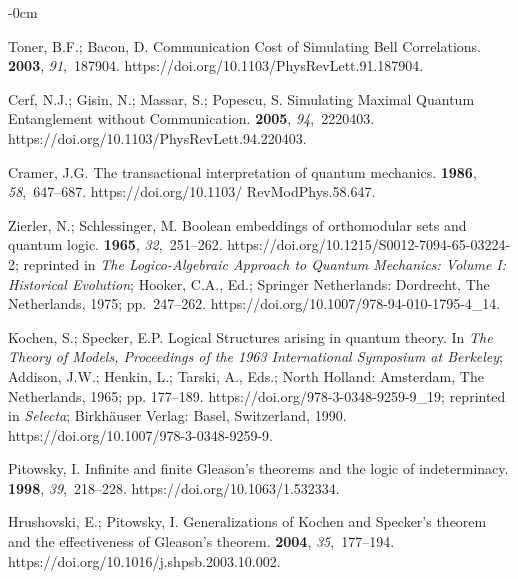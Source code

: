 \documentclass[entropy,article,accept,oneauthor,pdftex]{Definitions/mdpi}
\begin{document}
\begin{adjustwidth}{-\extralength}{0cm}
\begin{thebibliography}{999}
Toner, B.F.; Bacon, D.
\newblock Communication Cost of Simulating {B}ell Correlations.
 {\bf 2003}, {\em 91},~187904.
\newblock
  {https://doi.org/10.1103/PhysRevLett.91.187904}.



Cerf, N.J.; Gisin, N.; Massar, S.; Popescu, S.
\newblock Simulating Maximal Quantum Entanglement without Communication.
 {\bf 2005}, {\em 94},~2220403.
\newblock
  {https://doi.org/10.1103/PhysRevLett.94.220403}.

Cramer, J.G.
\newblock The transactional interpretation of quantum mechanics.
 {\bf 1986}, {\em 58},~647--687.
\newblock
  {https://doi.org/10.1103/ RevModPhys.58.647}.

Zierler, N.; Schlessinger, M.
\newblock Boolean embeddings of orthomodular sets and quantum logic.
 {\bf 1965}, {\em 32},~251--262.
\newblock
  {https://doi.org/10.1215/S0012-7094-65-03224-2};
 reprinted in \emph{The Logico-Algebraic Approach to Quantum Mechanics: Volume {I}:
  Historical Evolution}; Hooker, C.A., Ed.; Springer Netherlands: Dordrecht, The Netherlands,
  1975; pp.~247--262.
\newblock
  {https://doi.org/10.1007/978-94-010-1795-4\_14}.

Kochen, S.; Specker, E.P.
\newblock Logical Structures arising in quantum theory.
\newblock  In \emph{The Theory of Models, {P}roceedings of the 1963 International
  Symposium at {B}erkeley}; Addison, J.W.; Henkin, L.; Tarski, A., Eds.; North
  Holland: Amsterdam, The Netherlands, 1965; pp. 177--189.
\newblock
  {https://doi.org/978-3-0348-9259-9\_19}; reprinted in {\em Selecta}; Birkh{\"{a}}user Verlag: Basel, Switzerland, 1990.
\newblock
  {https://doi.org/10.1007/978-3-0348-9259-9}.

Pitowsky, I.
\newblock Infinite and finite {G}leason's theorems and the logic of
  indeterminacy.
 {\bf 1998}, {\em 39},~218--228.
\newblock
  {https://doi.org/10.1063/1.532334}.

Hrushovski, E.; Pitowsky, I.
\newblock Generalizations of {K}ochen and {S}pecker's theorem and the
  effectiveness of {G}leason's theorem.
 {\bf 2004}, {\em 35},~177--194.
\newblock
  {https://doi.org/10.1016/j.shpsb.2003.10.002}.


\end{thebibliography}
\end{adjustwidth}
\end{document}
